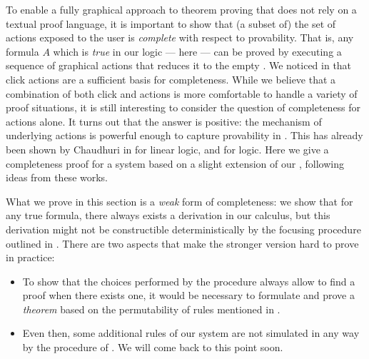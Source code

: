 \begin{scope}
To enable a fully graphical approach to theorem proving that does not rely on a
textual proof language, it is important to show that (a subset of) the set of
actions exposed to the user is \emph{complete} with respect to provability. That
is, any formula $A$ which is \emph{true} in our logic --- here
  --- can be proved by executing a sequence of
graphical actions that reduces it to the empty . We noticed in
 that click actions are a sufficient basis for
completeness. While we believe that a combination of both click and 
actions is more comfortable to handle a variety of proof situations, it is still
interesting to consider the question of completeness for  actions alone.
It turns out that the answer is positive: the mechanism of \emph{} underlying  actions is powerful enough to capture provability
in . This has already been shown by Chaudhuri in \cite{Chaudhuri2013}
for linear logic, and \cite{DBLP:conf/cade/Chaudhuri21} for 
logic. Here we give a completeness proof for a system based on a slight
extension of our , following ideas from these works.

\begin{remark}
  What we prove in this section is a \emph{weak} form of completeness: we show
  that for any true formula, there always exists a derivation in our
   calculus, but this derivation might not be
  constructible deterministically by the focusing procedure outlined in
  . There are two aspects that make the stronger version hard to
  prove in practice:
  \begin{itemize}
    \item To show that the choices performed by the  procedure
    always allow to find a proof when there exists one, it would be necessary to
    formulate and prove a \emph{ theorem} based on the
    permutability of rules mentioned in .
    \item Even then, some additional rules of our  system
    are not simulated in any way by the  procedure of .
    We will come back to this point soon.
  \end{itemize}  
\end{remark}


\end{scope}
